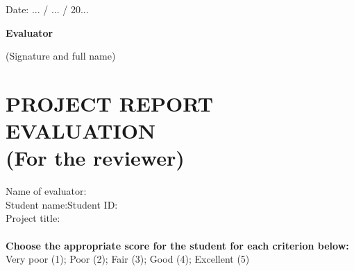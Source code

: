 \hspace{9cm} Date: ... / ... / 20...

\hspace{9.3cm}\textbf{Evaluator}

\vspace{-6pt}
\hspace{9cm}(Signature and full name)
\clearpage

\section*{PROJECT REPORT EVALUATION\\\fontsize{14pt}{0pt}\selectfont \vspace{4pt}\textnormal{(For the reviewer)}}
\thispagestyle{empty}
\vspace{-16pt}
\hspace{-1cm}Name of evaluator:\dotfill\\
Student name:\dotfill Student ID:\dotfill\\
Project title:\dotfill\\
\\
\textbf{Choose the appropriate score for the student for each criterion below:}\\
Very poor (1); Poor (2); Fair (3); Good (4); Excellent (5)
